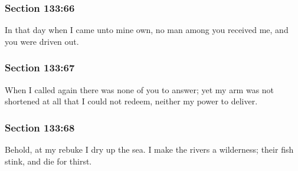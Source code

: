 	\subsubsection{Section 133:66} %
		\label{DC133-66}

		In that day when I came unto mine own, no man among you received me, and you were driven out.


	\subsubsection{Section 133:67} %
		\label{DC133-67}

		When I called again there was none of you to answer; yet my arm was not shortened at all that I could not redeem, neither my power to deliver.


	\subsubsection{Section 133:68} %
		\label{DC133-68}

		Behold, at my rebuke I dry up the sea.  I make the rivers a wilderness; their fish stink, and die for thirst.


